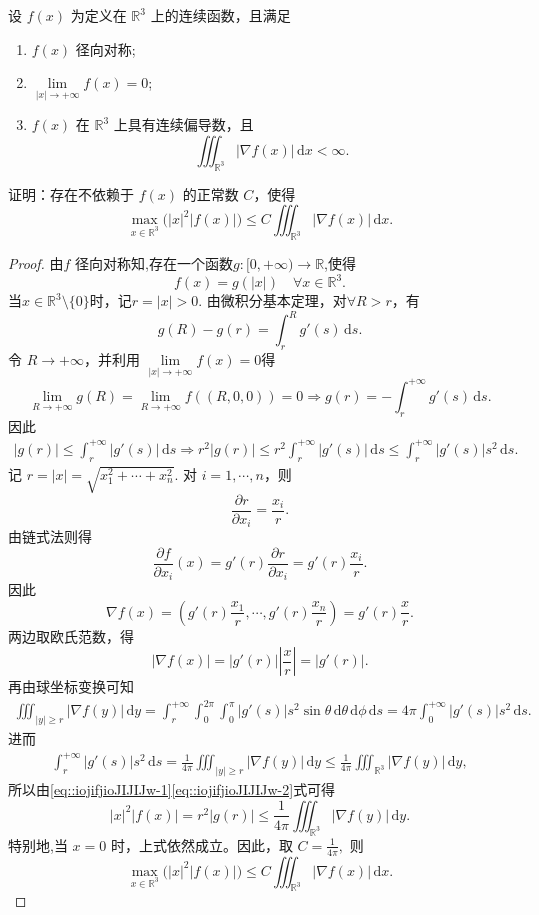\documentclass[../../main.tex]{subfiles}%
\begin{document}
\begin{example}
设 $f(x)$ 为定义在 $\mathbb{R}^3$ 上的连续函数，且满足
\begin{enumerate}[(1)]
\item $f(x)$ 径向对称;
\item $\lim\limits_{|x|\to+\infty}f(x)=0$;
\item $f(x)$ 在 $\mathbb{R}^3$ 上具有连续偏导数，且
\[
\iiint_{\mathbb{R}^3}|\nabla f(x)|\,\mathrm{d}x<\infty.
\]
\end{enumerate}
证明：存在不依赖于 $f(x)$ 的正常数 $C$，使得
\[
\max_{x\in\mathbb{R}^3}\bigl(|x|^2|f(x)|\bigr)
\leqslant C\iiint_{\mathbb{R}^3}|\nabla f(x)|\,\mathrm{d}x.
\]
\end{example}
\begin{proof}
由$f$ 径向对称知,存在一个函数$g:[0,+\infty)\to\mathbb{R}$,使得
\[
f(x)=g(|x|)\quad \forall x\in\mathbb{R}^3.
\]
当$x\in\mathbb{R}^3\setminus \{0\}$时，记$r=|x|>0$. 由微积分基本定理，对$\forall R>r$，有
\[
g(R)-g(r)=\int_r^R g'(s)\,\mathrm{d}s.
\]
令 $R\to+\infty$，并利用 $\lim\limits_{|x|\to+\infty}f(x)=0$得
\[
\lim\limits_{R\to+\infty}g(R)=\lim\limits_{R\to+\infty}f((R,0,0))=0 \Longrightarrow g(r)=-\int_r^{+\infty}g'(s)\,\mathrm{d}s.
\]
因此
\begin{align}
|g(r)|\leqslant \int_r^{+\infty}|g'(s)|\,\mathrm{d}s\Longrightarrow r^2|g(r)|\leqslant r^2\int_r^{+\infty}|g'(s)|\,\mathrm{d}s \leqslant \int_r^{+\infty}|g'(s)|s^2\,\mathrm{d}s.\label{eq::iojifjioJIJIJw-1}
\end{align}
记 $r=|x|=\sqrt{x_1^2+\cdots+x_n^2}$. 对 $i=1,\cdots,n$，则
\[
\frac{\partial r}{\partial x_i}=\frac{x_i}{r}.
\]
由链式法则得
\[
\frac{\partial f}{\partial x_i}(x)
= g'(r)\frac{\partial r}{\partial x_i}
= g'(r)\frac{x_i}{r}.
\]
因此
\[
\nabla f(x)=\left(g'(r)\frac{x_1}{r},\cdots,g'(r)\frac{x_n}{r}\right)
= g'(r)\frac{x}{r}.
\]
两边取欧氏范数，得
\[
|\nabla f(x)|=|g'(r)|\left|\frac{x}{r}\right|=|g'(r)|.
\]
再由球坐标变换可知
\begin{align*}
\iiint_{\left| y \right|\geqslant r}{|\nabla f(y)|\,\mathrm{d}y}=\int_r^{+\infty}{\int_0^{2\pi}{\int_0^{\pi}{|g' (s)|s^2\sin \theta \,\mathrm{d}\theta \,\mathrm{d}\phi \,\mathrm{d}s}}}=4\pi \int_0^{+\infty}{|g' (s)|s^2\,\mathrm{d}s}.
\end{align*}
进而
\begin{align}
\int_r^{+\infty}|g'(s)|s^2\,\mathrm{d}s
=\frac{1}{4\pi}\iiint_{|y|\geqslant r}|\nabla f(y)|\,\mathrm{d}y
\leqslant \frac{1}{4\pi}\iiint_{\mathbb{R}^3}|\nabla f(y)|\,\mathrm{d}y,\label{eq::iojifjioJIJIJw-2}
\end{align}
所以由\eqref{eq::iojifjioJIJIJw-1}\eqref{eq::iojifjioJIJIJw-2}式可得
\[
|x|^2|f(x)|=r^2|g(r)|\leqslant \frac{1}{4\pi}\iiint_{\mathbb{R}^3}|\nabla f(y)|\,\mathrm{d}y.
\]
特别地,当 $x=0$ 时，上式依然成立。因此，取
$C=\frac{1}{4\pi},$
则
\[
\max_{x\in\mathbb{R}^3}\bigl(|x|^2|f(x)|\bigr)
\leqslant C\iiint_{\mathbb{R}^3}|\nabla f(x)|\,\mathrm{d}x.
\]\end{proof}
\end{document}
